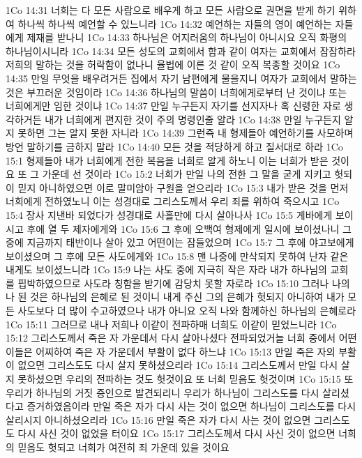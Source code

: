 1Co 14:31  너희는 다 모든 사람으로 배우게 하고 모든 사람으로 권면을 받게 하기 위하여 하나씩 하나씩 예언할 수 있느니라
1Co 14:32  예언하는 자들의 영이 예언하는 자들에게 제재를 받나니
1Co 14:33  하나님은 어지러움의 하나님이 아니시요 오직 화평의 하나님이시니라
1Co 14:34  모든 성도의 교회에서 함과 같이 여자는 교회에서 잠잠하라 저희의 말하는 것을 허락함이 없나니 율법에 이른 것 같이 오직 복종할 것이요
1Co 14:35  만일 무엇을 배우려거든 집에서 자기 남편에게 물을지니 여자가 교회에서 말하는 것은 부끄러운 것임이라
1Co 14:36  하나님의 말씀이 너희에게로부터 난 것이냐 또는 너희에게만 임한 것이냐
1Co 14:37  만일 누구든지 자기를 선지자나 혹 신령한 자로 생각하거든 내가 너희에게 편지한 것이 주의 명령인줄 알라
1Co 14:38  만일 누구든지 알지 못하면 그는 알지 못한 자니라
1Co 14:39  그런즉 내 형제들아 예언하기를 사모하며 방언 말하기를 금하지 말라
1Co 14:40  모든 것을 적당하게 하고 질서대로 하라
1Co 15:1  형제들아 내가 너희에게 전한 복음을 너희로 알게 하노니 이는 너희가 받은 것이요 또 그 가운데 선 것이라
1Co 15:2  너희가 만일 나의 전한 그 말을 굳게 지키고 헛되이 믿지 아니하였으면 이로 말미암아 구원을 얻으리라
1Co 15:3  내가 받은 것을 먼저 너희에게 전하였노니 이는 성경대로 그리스도께서 우리 죄를 위하여 죽으시고
1Co 15:4  장사 지낸바 되었다가 성경대로 사흘만에 다시 살아나사
1Co 15:5  게바에게 보이시고 후에 열 두 제자에게와
1Co 15:6  그 후에 오백여 형제에게 일시에 보이셨나니 그 중에 지금까지 태반이나 살아 있고 어떤이는 잠들었으며
1Co 15:7  그 후에 야고보에게 보이셨으며 그 후에 모든 사도에게와
1Co 15:8  맨 나중에 만삭되지 못하여 난자 같은 내게도 보이셨느니라
1Co 15:9  나는 사도 중에 지극히 작은 자라 내가 하나님의 교회를 핍박하였으므로 사도라 칭함을 받기에 감당치 못할 자로라
1Co 15:10  그러나 나의 나 된 것은 하나님의 은혜로 된 것이니 내게 주신 그의 은혜가 헛되지 아니하여 내가 모든 사도보다 더 많이 수고하였으나 내가 아니요 오직 나와 함께하신 하나님의 은혜로라
1Co 15:11  그러므로 내나 저희나 이같이 전파하매 너희도 이같이 믿었느니라
1Co 15:12  그리스도께서 죽은 자 가운데서 다시 살아나셨다 전파되었거늘 너희 중에서 어떤이들은 어찌하여 죽은 자 가운데서 부활이 없다 하느냐
1Co 15:13  만일 죽은 자의 부활이 없으면 그리스도도 다시 살지 못하셨으리라
1Co 15:14  그리스도께서 만일 다시 살지 못하셨으면 우리의 전파하는 것도 헛것이요 또 너희 믿음도 헛것이며
1Co 15:15  또 우리가 하나님의 거짓 증인으로 발견되리니 우리가 하나님이 그리스도를 다시 살리셨다고 증거하였음이라 만일 죽은 자가 다시 사는 것이 없으면 하나님이 그리스도를 다시 살리시지 아니하셨으리라
1Co 15:16  만일 죽은 자가 다시 사는 것이 없으면 그리스도도 다시 사신 것이 없었을 터이요
1Co 15:17  그리스도께서 다시 사신 것이 없으면 너희의 믿음도 헛되고 너희가 여전히 죄 가운데 있을 것이요
